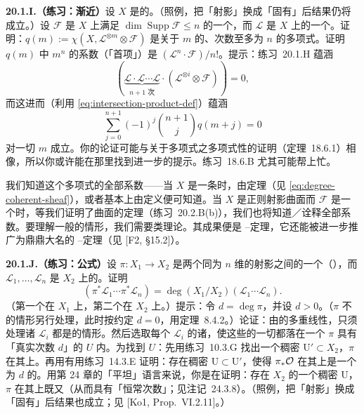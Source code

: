 \textbf{20.1.I.（练习：渐近\trRiemannRoch）}\quad 设 $X$ 是\trProjective{}的。（照例，把「射影」换成「固有」后结果仍将成立。）设 $\mathscr{F}$ 是 $X$ 上满足 $\dim\operatorname{Supp}\mathscr{F}\le n$ 的一个\trCoherentSheaf，而 $\mathscr{L}$ 是 $X$ 上的一个\trLineBundle。证明：$q(m):=\chi(X,\mathscr{L}^{\otimes m}\otimes\mathscr{F})$ 是关于 $m$ 的、次数至多为 $n$ 的多项式。证明 $q(m)$ 中 $m^n$ 的系数（「首项」）是 $(\mathscr{L}^n\cdot\mathscr{F})/n!$。提示：\mbox{练习~20.1.H} 蕴涵
\[
(\underbrace{\mathscr{L}\cdot\mathscr{L}\cdots\mathscr{L}}_{n+1\text{ 次}}\cdot(\mathscr{L}^{\otimes i}\otimes\mathscr{F}))=0,
\]
而这进而（利用 \eqref{eq:intersection-product-def}）蕴涵
\[
\sum_{j=0}^{n+1}(-1)^j\binom{n+1}{j}q(m+j)=0
\]
对一切 $m$ 成立。你的论证可能与关于\trHilbert{}多项式之多项式性的证明（\mbox{定理~18.6.1}）相像，所以你或许能在那里找到进一步的提示。\mbox{练习~18.6.B} 尤其可能帮上忙。

我们知道这个多项式的全部系数——当 $X$ 是一条\trCurve{}时，由\trRiemannRoch{}定理（见 \eqref{eq:degree-coherent-sheaf}），或者基本上由定义便可知道。当 $X$ 是正则射影曲面而 $\mathscr{F}$ 是一个\trInvertibleSheaf{}时，等我们证明了曲面的\trRiemannRoch{}定理（\mbox{练习~20.2.B(b)}），我们也将知道／诠释全部系数。要理解一般的情形，我们需要\trChern{}类理论。其成果便是 \trHirzebruch--\trRiemannRoch{}定理，它还能被进一步推广为鼎鼎大名的 \trGrothendieck--\trRiemannRoch{}定理（见 [F2, \S15.2]）。

\textbf{20.1.J.（练习：\trProjection{}公式）}\quad 设 $\pi\colon X_1\to X_2$ 是两个同为 $n$ 维的\trIntegral{}射影\trVariety{}之间的一个（\trProjective{}）\trMorphism，而 $\mathscr{L}_1,\dots,\mathscr{L}_n$ 是 $X_2$ 上的\trInvertibleSheaf。证明
\[
(\pi^*\mathscr{L}_1\cdots\pi^*\mathscr{L}_n)=\deg(X_1/X_2)(\mathscr{L}_1\cdots\mathscr{L}_n).
\]
（第一个\trIntersectionProduct{}在 $X_1$ 上，第二个在 $X_2$ 上。）提示：令 $d=\deg\pi$，并设 $d>0$。（$\pi$ 不\trDominant{}的情形另行处理，此时按约定 $d=0$，用\mbox{\trChevalley{}定理~8.4.2}。）论证：由\trIntersectionProduct{}的多重线性，只须处理诸 $\mathscr{L}_i$ 都是\trVeryAmple{}的情形。然后选取每个 $\mathscr{L}_i$ 的诸\trSection，使这些\trSection{}的一切\trIntersection{}都落在一个 $\pi$ 具有「真实次数 $d$」的\trOpenSubset{} $U$ 内。为找到 $U$：先用\mbox{练习~10.3.G} 找出一个稠密\trOpenSubset{} $\mathrm{U}'\subset X_2$，$\pi$ 在其上\trFinite。再用\mbox{有用练习~14.3.E} 证明：存在稠密\trOpenSubset{} $\mathrm{U}\subset\mathrm{U}'$，使得 $\pi_*\mathcal{O}$ 在其上是一个\trRank{}为 $d$ 的\trLocallyFreeSheaf。用第 24 章的「平坦」语言来说，你是在证明：存在 $X_2$ 的一个稠密\trOpenSubset{} $\mathrm{U}$，$\pi$ 在其上既\trFinite{}又\trFlat（从而具有「恒常次数」；见\mbox{注记~24.3.8}）。（照例，把「射影」换成「固有」后结果也成立；见 [Ko1, Prop.~VI.2.11]。）

